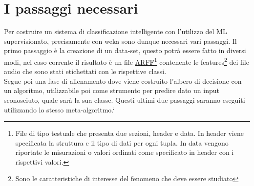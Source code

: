 \section{I passaggi necessari}
Per costruire un sistema di classificazione intelligente con l'utilizzo del ML supervisionato, precisamente con weka sono dunque necessari vari passaggi. Il primo passaggio è la creazione di un data-set, questo potrà essere fatto in diversi modi, nel caso corrente il risultato è un file \href{https://www.cs.waikato.ac.nz/ml/weka/arff.html}{ARFF}\footnote{File di tipo testuale che presenta due sezioni, header e data. In header viene specificata la struttura e il tipo di dati per ogni tupla. In data vengono riportate le misurazioni o valori ordinati come specificato in header con i rispettivi valori.} contenente le features\footnote{Sono le caratteristiche di interesse del fenomeno che deve essere studiato} dei file audio che sono stati etichettati con le rispettive classi.\\
Segue poi una fase di allenamento dove viene costruito l'albero di decisione con un algoritmo, utilizzabile poi come strumento per predire dato un input sconosciuto, quale sarà la sua classe. Questi ultimi due passaggi saranno eseguiti utilizzando lo stesso meta-algoritmo.`
